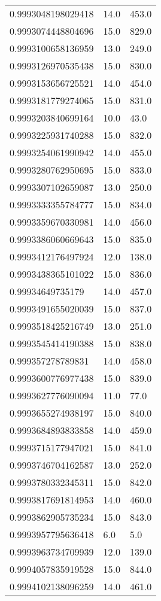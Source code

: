 \begin{center}
\begin{supertabular}[H]{p{0.30\textwidth}p{0.05\textwidth}p{0.05\textwidth}}
0.9993048198029418 & 14.0 & 453.0 \\ 
0.9993074448804696 & 15.0 & 829.0 \\ 
0.9993100658136959 & 13.0 & 249.0 \\ 
0.9993126970535438 & 15.0 & 830.0 \\ 
0.9993153656725521 & 14.0 & 454.0 \\ 
0.9993181779274065 & 15.0 & 831.0 \\ 
0.9993203840699164 & 10.0 & 43.0 \\ 
0.9993225931740288 & 15.0 & 832.0 \\ 
0.9993254061990942 & 14.0 & 455.0 \\ 
0.9993280762950695 & 15.0 & 833.0 \\ 
0.9993307102659087 & 13.0 & 250.0 \\ 
0.9993333355784777 & 15.0 & 834.0 \\ 
0.9993359670330981 & 14.0 & 456.0 \\ 
0.9993386060669643 & 15.0 & 835.0 \\ 
0.9993412176497924 & 12.0 & 138.0 \\ 
0.9993438365101022 & 15.0 & 836.0 \\ 
0.99934649735179 & 14.0 & 457.0 \\ 
0.9993491655020039 & 15.0 & 837.0 \\ 
0.9993518425216749 & 13.0 & 251.0 \\ 
0.9993545414190388 & 15.0 & 838.0 \\ 
0.999357278789831 & 14.0 & 458.0 \\ 
0.9993600776977438 & 15.0 & 839.0 \\ 
0.9993627776090094 & 11.0 & 77.0 \\ 
0.9993655274938197 & 15.0 & 840.0 \\ 
0.9993684893833858 & 14.0 & 459.0 \\ 
0.9993715177947021 & 15.0 & 841.0 \\ 
0.9993746704162587 & 13.0 & 252.0 \\ 
0.9993780332345311 & 15.0 & 842.0 \\ 
0.9993817691814953 & 14.0 & 460.0 \\ 
0.9993862905735234 & 15.0 & 843.0 \\ 
0.9993957795636418 & 6.0 & 5.0 \\ 
0.9993963734709939 & 12.0 & 139.0 \\ 
0.9994057835919528 & 15.0 & 844.0 \\ 
0.9994102138096259 & 14.0 & 461.0 \\ 

\end{supertabular}
\end{center}
